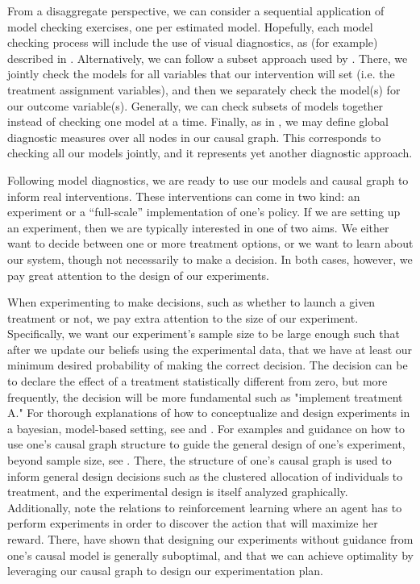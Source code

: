 From a disaggregate perspective, we can consider a sequential application of model checking exercises, one per estimated model.
Hopefully, each model checking process will include the use of visual diagnostics, as (for example) described in \citet{brathwaite_2018_check}.
Alternatively, we can follow a subset approach used by \citet{tran_2016_model}.
There, we jointly check the models for all variables that our intervention will set (i.e. the treatment assignment variables), and then we separately check the model(s) for our outcome variable(s).
Generally, we can check subsets of models together instead of checking one model at a time.
Finally, as in \citet{williamson_2013_model}, we may define global diagnostic measures over all nodes in our causal graph.
This corresponds to checking all our models jointly, and it represents yet another diagnostic approach.

Following model diagnostics, we are ready to use our models and causal graph to inform real interventions.
These interventions can come in two kind: an experiment or a ``full-scale'' implementation of one's policy.
If we are setting up an experiment, then we are typically interested in one of two aims.
We either want to decide between one or more treatment options, or we want to learn about our system, though not necessarily to make a decision.
In both cases, however, we pay great attention to the design of our experiments.

When experimenting to make decisions, such as whether to launch a given treatment or not, we pay extra attention to the size of our experiment.
Specifically, we want our experiment's sample size to be large enough such that after we update our beliefs using the experimental data, that we have at least our minimum desired probability of making the correct decision.
The decision can be to declare the effect of a treatment statistically different from zero, but more frequently, the decision will be more fundamental such as "implement treatment A."
For thorough explanations of how to conceptualize and design experiments in a bayesian, model-based setting, see \citet{chaloner_1995_bayesian} and \citet{wang_2002_simulation}.
For examples and guidance on how to use one's causal graph structure to guide the general design of one's experiment, beyond sample size, see \citet{madrigal_2007_cluster}.
There, the structure of one's causal graph is used to inform general design decisions such as the clustered allocation of individuals to treatment, and the experimental design is itself analyzed graphically.
Additionally, note the relations to reinforcement learning where an agent has to perform experiments in order to discover the action that will maximize her reward.
There, \citet{lee_2018_structural} have shown that designing our experiments without guidance from one's causal model is generally suboptimal, and that we can achieve optimality by leveraging our causal graph to design our experimentation plan.

